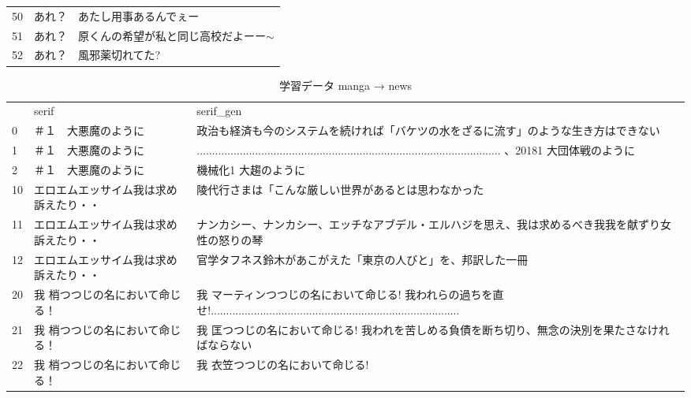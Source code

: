 \documentclass[onecolumn]{ujarticle}   %
\begin{document}
\begin{table}[tbh]
\begin{center}
\begin{tabular}{lp{5cm}p{7cm}}
      50  & あれ？                                     & あたし用事あるんでぇー                                \\
      51  & あれ？                                     & 原くんの希望が私と同じ高校だよーー$\sim$                    \\
      52  & あれ？                                     & 風邪薬切れてた?                                   \\


    \end{tabular}

    \label{tab:news_manga}
  \end{center}
\end{table}


\begin{table}[tbh]
  \begin{center}
    \caption{学習データ manga → news}

    \begin{tabular}{lp{5cm}p{7cm}}
 &
  serif &
  serif\_gen \\
0 &
  ＃１　大悪魔のように &
  政治も経済も今のシステムを続ければ「バケツの水をざるに流す」のような生き方はできない \\
1 &
  ＃１　大悪魔のように &
  ................................................................................................... 、20181 大団体戦のように \\
2 &
  ＃１　大悪魔のように &
  機械化1 大趨のように \\

10 &
  エロエムエッサイム我は求め訴えたり・・ &
  陵代行さまは「こんな厳しい世界があるとは思わなかった \\
11 &
  エロエムエッサイム我は求め訴えたり・・ &
  ナンカシー、ナンカシー、エッチなアブデル・エルハジを思え、我は求めるべき我我を献ずり女性の怒りの琴 \\
12 &
  エロエムエッサイム我は求め訴えたり・・ &
  官学タフネス鈴木があこがえた「東京の人びと」を、邦訳した一冊 \\

20 &
  我 梢つつじの名において命じる！ &
  我 マーティンつつじの名において命じる! 我われらの過ちを直せ!................................................................................. \\
21 &
  我 梢つつじの名において命じる！ &
  我 匡つつじの名において命じる! 我われを苦しめる負債を断ち切り、無念の決別を果たさなければならない \\
22 &
  我 梢つつじの名において命じる！ &
  我 衣笠つつじの名において命じる! \\



\end{tabular}
\end{center}
\end{table}
\end{document}
